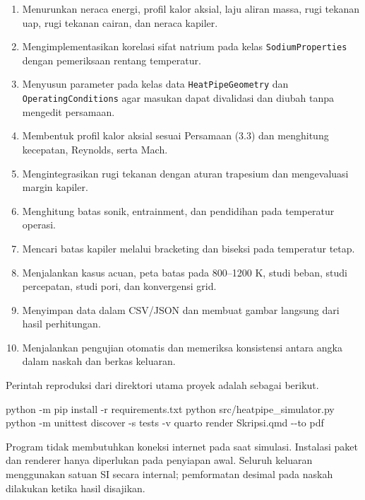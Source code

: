 \documentclass[
  12pt,
  12pt,a4paper,oneside]{report}
\newenvironment{Shaded}{}{}
\newcommand{\AttributeTok}[1]{\textcolor[rgb]{0.49,0.56,0.16}{#1}}
\newcommand{\ExtensionTok}[1]{#1}
\newcommand{\NormalTok}[1]{#1}
\providecommand{\tightlist}{%
  \setlength{\itemsep}{0pt}\setlength{\parskip}{0pt}}
\begin{document}
\begin{enumerate}
\def\labelenumi{\arabic{enumi}.}
\tightlist
\item
  Menurunkan neraca energi, profil kalor aksial, laju aliran massa, rugi
  tekanan uap, rugi tekanan cairan, dan neraca kapiler.
\item
  Mengimplementasikan korelasi sifat natrium pada kelas
  \texttt{SodiumProperties} dengan pemeriksaan rentang temperatur.
\item
  Menyusun parameter pada kelas data \texttt{HeatPipeGeometry} dan
  \texttt{OperatingConditions} agar masukan dapat divalidasi dan diubah
  tanpa mengedit persamaan.
\item
  Membentuk profil kalor aksial sesuai Persamaan (3.3) dan menghitung
  kecepatan, Reynolds, serta Mach.
\item
  Mengintegrasikan rugi tekanan dengan aturan trapesium dan mengevaluasi
  margin kapiler.
\item
  Menghitung batas sonik, entrainment, dan pendidihan pada temperatur
  operasi.
\item
  Mencari batas kapiler melalui bracketing dan biseksi pada temperatur
  tetap.
\item
  Menjalankan kasus acuan, peta batas pada 800--1200 K, studi beban,
  studi percepatan, studi pori, dan konvergensi grid.
\item
  Menyimpan data dalam CSV/JSON dan membuat gambar langsung dari hasil
  perhitungan.
\item
  Menjalankan pengujian otomatis dan memeriksa konsistensi antara angka
  dalam naskah dan berkas keluaran.
\end{enumerate}

Perintah reproduksi dari direktori utama proyek adalah sebagai berikut.

\begin{Shaded}
\begin{Highlighting}[]
\ExtensionTok{python} \AttributeTok{{-}m}\NormalTok{ pip install }\AttributeTok{{-}r}\NormalTok{ requirements.txt}
\ExtensionTok{python}\NormalTok{ src/heatpipe\_simulator.py}
\ExtensionTok{python} \AttributeTok{{-}m}\NormalTok{ unittest discover }\AttributeTok{{-}s}\NormalTok{ tests }\AttributeTok{{-}v}
\ExtensionTok{quarto}\NormalTok{ render Skripsi.qmd }\AttributeTok{{-}{-}to}\NormalTok{ pdf}
\end{Highlighting}
\end{Shaded}

Program tidak membutuhkan koneksi internet pada saat simulasi. Instalasi
paket dan renderer hanya diperlukan pada penyiapan awal. Seluruh
keluaran menggunakan satuan SI secara internal; pemformatan desimal pada
naskah dilakukan ketika hasil disajikan.
\end{document}
